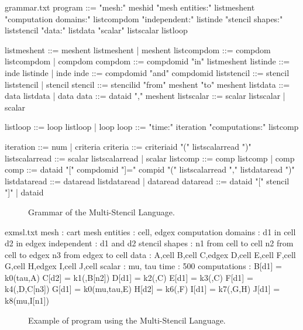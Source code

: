 \begin{filecontents*}{grammar.txt}
program ::= "mesh:" meshid 
            "mesh entities:" listmeshent
            "computation domains:" 
                      listcompdom
            "independent:"
                      listinde
            "stencil shapes:"
                      liststencil
            "data:" listdata
            "scalar" listscalar
            listloop

listmeshent ::= meshent listmeshent 
                        |  meshent
listcompdom ::= compdom listcompdom 
                        |  compdom
compdom ::= compdomid "in" listmeshent
listinde ::= inde listinde |  inde
inde ::= compdomid "and" compdomid
liststencil ::= stencil liststencil 
                        | stencil
stencil ::= stencilid "from" meshent "to" meshent
listdata ::= data listdata |  data
data ::= dataid "," meshent
listscalar ::= scalar listscalar 
                      | scalar

listloop ::= loop listloop | loop
loop ::=  "time:" iteration
          "computations:" listcomp
          
iteration ::= num | criteria
criteria ::= criteriaid "(" listscalarread ")"
listscalarread ::= scalar listscalarread 
                          |  scalar
listcomp ::= comp listcomp |  comp
comp ::= dataid "[" compdomid "]=" 
                    compid "({" 
                    listscalarread "},{" 
                    listdataread "})"
listdataread ::= dataread listdataread 
                          |  dataread
dataread ::= dataid "[" stencil "]" 
              |  dataid
\end{filecontents*}

\begin{figure}[!h]
  \hspace{5mm}
  \begin{minipage}[!h]{0.5\textwidth}
    {}   
    \caption{Grammar of the Multi-Stencil Language. \label{fig:grammar}}
  \end{minipage}
\end{figure}

\begin{filecontents*}{exmsl.txt}
mesh : cart
mesh entities : cell, edgex
computation domains :
  d1 in cell
  d2 in edgex
independent :
  d1 and d2
stencil shapes : 
  n1 from cell to cell
  n2 from cell to edgex
  n3 from edgex to cell
data :
  A,cell
  B,cell
  C,edgex
  D,cell
  E,cell
  F,cell
  G,cell
  H,edgex
  I,cell
  J,cell
scalar : mu, tau
time : 500
computations :
  B[d1] = k0({tau},{A})
  C[d2] = k1({},{B[n2]})
  D[d1] = k2({},{C})
  E[d1] = k3({},{C})
  F[d1] = k4({},{D,C[n3]})
  G[d1] = k0({mu,tau},{E})
  H[d2] = k6({},{F})
  I[d1] = k7({},{G,H})
  J[d1] = k8({mu},{I[n1]})
\end{filecontents*}

\begin{figure}[!h]
  \hspace{5mm}
  \begin{minipage}[!h]{0.4\textwidth}
    {}   
    \caption{Example of program using the Multi-Stencil Language. \label{fig:exmsl}}
  \end{minipage}
\end{figure}